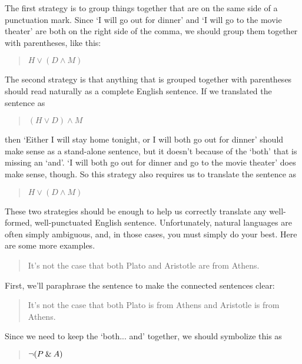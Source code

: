 \documentclass[../logic-text.tex]{subfiles}
\begin{document}
The first strategy is to group things together that are on the same side of a punctuation mark. Since \enquote*{I will go out for dinner} and \enquote*{I will go to the movie theater} are both on the right side of the comma, we should group them together with parentheses, like this:  

\begin{quote}
    \(H \lor (D \land M)\)
\end{quote}

The second strategy is that anything that is grouped together with parentheses should read naturally as a complete English sentence. If we translated the sentence as

\begin{quote}
  \((H \lor D) \land M\)
\end{quote}

\noindent then \enquote*{Either I will stay home tonight, or I will both go out for dinner} should make sense as a stand-alone sentence, but it doesn't because of the \enquote*{both} that is missing an \enquote*{and}. \enquote*{I will both go out for dinner and go to the movie theater} does make sense, though. So this strategy also requires us to translate the sentence as

\begin{quote}
  \(H \lor (D \land M)\)
\end{quote}

These two strategies should be enough to help us correctly translate any well-formed, well-punctuated English sentence. Unfortunately, natural languages are often simply ambiguous, and, in those cases, you must simply do your best. Here are some more examples.


\begin{quote}
  It's not the case that both Plato and Aristotle are from Athens.
\end{quote}


First, we'll paraphrase the sentence to make the connected sentences clear:

\begin{quote}
  It's not the case that both Plato is from Athens and Aristotle is from Athens.
\end{quote}



\noindent Since we need to keep the \enquote*{both... and} together, we should symbolize this as

\begin{quote}
  \(\neg (P \mathbin{\&} A)\)
\end{quote}
\end{document}
